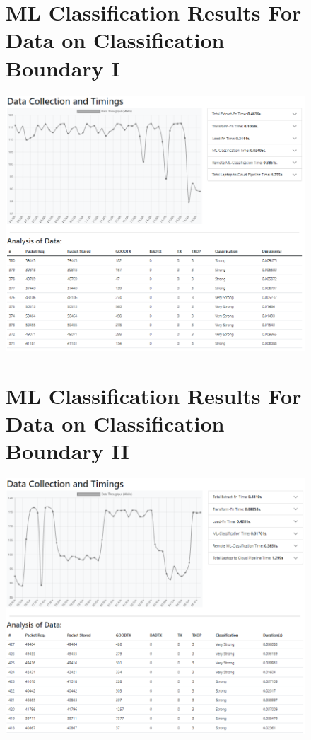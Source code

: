 \begin{figure}
\begin{minipage}{\linewidth}
\section{ML Classification Results For Data on Classification Boundary I}
    \centering
    \includegraphics[width=1\linewidth]{images/boundary1.PNG}
    \label{appendix:Boundarydata}
\end{minipage}
\end{figure}

\begin{figure}
\begin{minipage}{\linewidth}
\section{ML Classification Results For Data on Classification Boundary II}
    \centering
    \includegraphics[width=1\linewidth]{images/boundary2.PNG}
    \label{appendix:Boundary2data}
\end{minipage}
\end{figure}